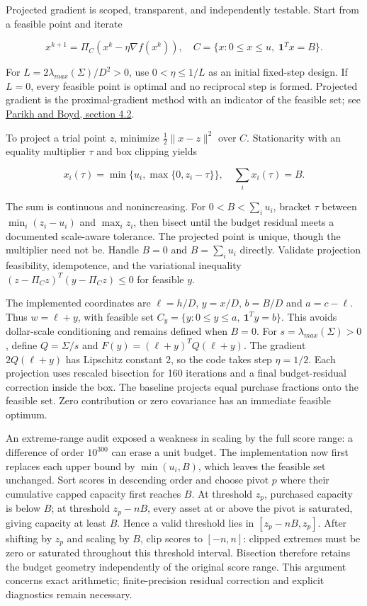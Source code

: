 \documentclass[
  american,
  11pt,
]{article}
\begin{document}
Projected gradient is scoped, transparent, and independently testable.
Start from a feasible point and iterate

\[x^{k+1}=\Pi_C(x^k-\eta\nabla f(x^k)),\quad
C=\{x:0\le x\le u,\;\mathbf1^Tx=B\}.\]

For \(L=2\lambda_{max}(\Sigma)/D^2>0\), use \(0<\eta\le1/L\) as an
initial fixed-step design. If \(L=0\), every feasible point is optimal
and no reciprocal step is formed. Projected gradient is the
proximal-gradient method with an indicator of the feasible set; see
\href{https://web.stanford.edu/~boyd/papers/pdf/prox_algs.pdf}{Parikh
and Boyd, section 4.2}.

To project a trial point \(z\), minimize \(\frac12\|x-z\|^2\) over
\(C\). Stationarity with an equality multiplier \(\tau\) and box
clipping yields

\[x_i(\tau)=\min\{u_i,\max\{0,z_i-\tau\}\},\quad
\sum_i x_i(\tau)=B.\]

The sum is continuous and nonincreasing. For \(0<B<\sum_i u_i\), bracket
\(\tau\) between \(\min_i(z_i-u_i)\) and \(\max_i z_i\), then bisect
until the budget residual meets a documented scale-aware tolerance. The
projected point is unique, though the multiplier need not be. Handle
\(B=0\) and \(B=\sum_i u_i\) directly. Validate projection feasibility,
idempotence, and the variational inequality
\((z-\Pi_Cz)^T(y-\Pi_Cz)\le0\) for feasible \(y\).

The implemented coordinates are \(\ell=h/D\), \(y=x/D\), \(b=B/D\) and
\(a=c-\ell\). Thus \(w=\ell+y\), with feasible set
\(C_y=\{y:0\le y\le a,\ \mathbf1^Ty=b\}\).
This avoids dollar-scale conditioning and remains defined when \(B=0\).
For \(s=\lambda_{max}(\Sigma)>0\), define \(Q=\Sigma/s\) and
\(F(y)=(\ell+y)^TQ(\ell+y)\). The gradient \(2Q(\ell+y)\) has Lipschitz
constant 2, so the code takes step \(\eta=1/2\). Each projection uses
rescaled bisection for 160 iterations and a final budget-residual
correction inside the box. The baseline projects equal purchase
fractions onto the feasible set. Zero contribution or zero covariance
has an immediate feasible optimum.

An extreme-range audit exposed a weakness in scaling by the full score
range: a difference of order $10^{300}$ can erase a unit budget. The
implementation now first replaces each upper bound by $\min(u_i,B)$,
which leaves the feasible set unchanged. Sort scores in descending order
and choose pivot $p$ where their cumulative capped capacity first reaches
$B$. At threshold $z_p$, purchased capacity is below $B$; at threshold
$z_p-nB$, every asset at or above the pivot is saturated, giving capacity
at least $B$. Hence a valid threshold lies in $[z_p-nB,z_p]$.
After shifting by $z_p$ and scaling by $B$, clip scores to $[-n,n]$:
clipped extremes must be zero or saturated throughout this threshold
interval. Bisection therefore retains the budget geometry independently
of the original score range. This argument concerns exact arithmetic;
finite-precision residual correction and explicit diagnostics remain necessary.
\end{document}
